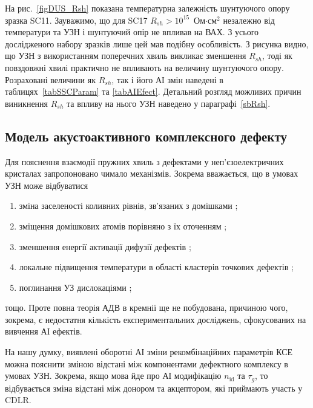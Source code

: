 На рис.~\ref{figDUS_Rsh} показана температурна залежність шунтуючого опору зразка SC11.
Зауважимо, що для SC17 $R_{sh}>10^{15}$~Ом$\cdot$см$^2$ незалежно від температури та УЗН і
шунтуючий опір не впливав на ВАХ.
З усього дослідженого набору зразків лише цей мав подібну особливість.
З рисунка видно, що УЗН з використанням поперечних хвиль викликає зменшення $R_{sh}$,
тоді як повздовжні хвилі практично не впливають на величину шунтуючого опору.
Розраховані величини як $R_{sh}$, так і його АІ змін наведені в таблицях~\ref{tabSSCParam} та \ref{tabAIEfect}.
Детальний розгляд можливих причин виникнення $R_{sh}$ та впливу на нього УЗН наведено у параграфі~\ref{sbRsh}.

\subsection{Модель акустоактивного комплексного дефекту\label{sbAEDefect}}

Для пояснення взаємодії пружних хвиль з дефектами у неп'єзоелектричних кристалах
запропоновано чимало механізмів.
Зокрема вважається, що в умовах УЗН може відбуватися
\begin{enumerate}[label=\asbuk*),leftmargin=0em,itemindent=1.5em]
\item зміна заселеності коливних рівнів, зв'язаних з домішками \cite{Pavlovich};
\item зміщення домішкових атомів порівняно з їх оточенням \cite{Korotchenkov1995,MirzadeR,MirzadeJAP2011,PELESHCHAK:UPJ2016};
\item зменшення енергії активації дифузії дефектів \cite{Krevchik};
\item локальне підвищення температури в області кластерів точкових дефектів  \cite{MirzadeJAP2005};
\item поглинання УЗ дислокаціями \cite{Davletova2008,OstrovKor92};
\end{enumerate}
тощо.
Проте повна теорія АДВ в кремнії ще не побудована, причиною чого, зокрема, є недостатня
кількість експериментальних досліджень, сфокусованих на вивчення АІ ефектів.

На нашу думку, виявлені оборотні АІ зміни рекомбінаційних параметрів КСЕ можна пояснити зміною
відстані між компонентами дефектного комплексу в умовах УЗН.
Зокрема, якщо мова йде про АІ модифікацію $n_{\mathrm{id}}$ та $\tau_g$,
то відбувається зміна відстані між донором та акцептором, які приймають участь у CDLR.


